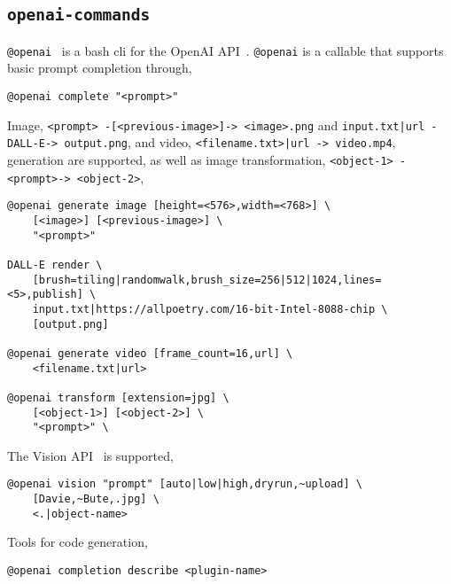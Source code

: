 \subsection{\texttt{openai-commands}}

\texttt{@openai}~\cite{openai_commands} is a bash cli for the OpenAI API~\cite{openai_api}. \texttt{@openai} is a callable that supports basic prompt completion through,
%
\begin{verbatim}
@openai complete "<prompt>"
\end{verbatim}
%
Image, \texttt{<prompt> -[<previous-image>]-> <image>.png} and \texttt{input.txt|url -DALL-E-> output.png}, and video, \texttt{<filename.txt>|url -> video.mp4}, generation are supported, as well as image transformation, \texttt{<object-1> -<prompt>-> <object-2>},
%
\begin{verbatim}
@openai generate image [height=<576>,width=<768>] \
    [<image>] [<previous-image>] \
    "<prompt>"

DALL-E render \
    [brush=tiling|randomwalk,brush_size=256|512|1024,lines=<5>,publish] \
    input.txt|https://allpoetry.com/16-bit-Intel-8088-chip \
    [output.png]

@openai generate video [frame_count=16,url] \
    <filename.txt|url>

@openai transform [extension=jpg] \
    [<object-1>] [<object-2>] \
    "<prompt>" \
\end{verbatim}
%
The Vision API~\cite{openai_vision} is supported,
%
\begin{verbatim}
@openai vision "prompt" [auto|low|high,dryrun,~upload] \
    [Davie,~Bute,.jpg] \
    <.|object-name>
\end{verbatim}
%
Tools for code generation,
%
\begin{verbatim}
@openai completion describe <plugin-name>
\end{verbatim}